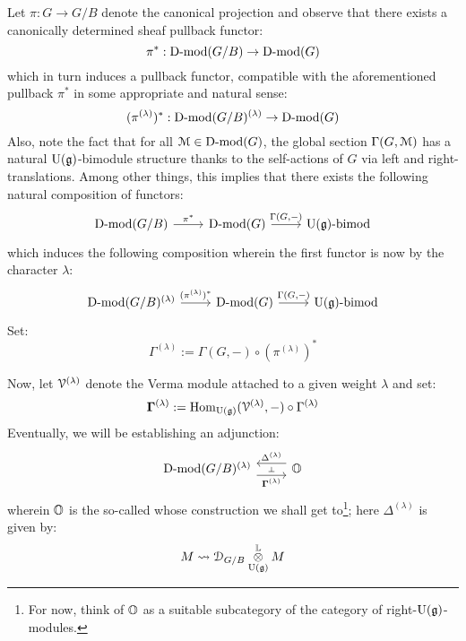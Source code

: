                 Let $\pi: G \to G/B$ denote the canonical projection and observe that there exists a canonically determined sheaf pullback functor:
                    $$\pi^*: \mathrm{D}\text{-}\mathrm{mod}(G/B) \to \mathrm{D}\text{-}\mathrm{mod}(G)$$
                which in turn induces a  pullback functor, compatible with the aforementioned pullback $\pi^*$ in some appropriate and natural sense:
                    $$(\pi^{(\lambda)})^*: \mathrm{D}\text{-}\mathrm{mod}(G/B)^{(\lambda)} \to \mathrm{D}\text{-}\mathrm{mod}(G)$$
                Also, note the fact that for all $\mathcal{M} \in \mathrm{D}\text{-}\mathrm{mod}(G)$, the global section $\Gamma(G, \mathcal{M})$ has a natural $\mathrm{U}(\mathfrak{g})$-bimodule structure thanks to the self-actions of $G$ via left and right-translations. Among other things, this implies that there exists the following natural composition of functors:
                    $$
                        \begin{tikzcd}
                        	{\Dmod(G/B}) & {\Dmod(G)} & {\U(\g)\bimod}
                        	\arrow["{\pi^*}", from=1-1, to=1-2]
                        	\arrow["{\Gamma(G, -)}", from=1-2, to=1-3]
                        \end{tikzcd}
                    $$
                which induces the following composition wherein the first functor is now  by the character $\lambda$:
                    $$
                        \begin{tikzcd}
                        	{\Dmod(G/B)^{(\lambda)}} & {\Dmod(G)} & {\U(\g)\bimod}
                        	\arrow["{(\pi^{(\lambda)})^*}", from=1-1, to=1-2]
                        	\arrow["{\Gamma(G, -)}", from=1-2, to=1-3]
                        \end{tikzcd}
                    $$
                Set:
                    $$\Gamma^{(\lambda)} := \Gamma(G, -) \circ (\pi^{(\lambda)})^*$$
                
                Now, let $\mathcal{V}^{(\lambda)}$ denote the Verma module attached to a given weight $\lambda$ and set:
                    $$\mathbf{\Gamma}^{(\lambda)} := \mathrm{Hom}_{\mathrm{U}(\mathfrak{g})}(\mathcal{V}^{(\lambda)}, -) \circ \Gamma^{(\lambda)}$$
                Eventually, we will be establishing an adjunction:
                    $$
                        \begin{tikzcd}
                        	{\Dmod(G/B)^{(\lambda)}} & \O
                        	\arrow[""{name=0, anchor=center, inner sep=0}, "{\bfGamma^{(\lambda)}}"', shift right=2, from=1-1, to=1-2]
                        	\arrow[""{name=1, anchor=center, inner sep=0}, "{\Delta^{(\lambda)}}"', shift right=2, from=1-2, to=1-1]
                        	\arrow["\dashv"{anchor=center, rotate=-90}, draw=none, from=1, to=0]
                        \end{tikzcd}
                    $$
                wherein $\mathbb{O}$ is the so-called  whose construction we shall get to\footnote{For now, think of $\mathbb{O}$ as a suitable subcategory of the category of right-$\mathrm{U}(\mathfrak{g})$-modules.}; here $\Delta^{(\lambda)}$ is given by:
                    $$M \mapsto \D_{G/B} \tensor^{\L}_{\U(\g)} M$$
                    
